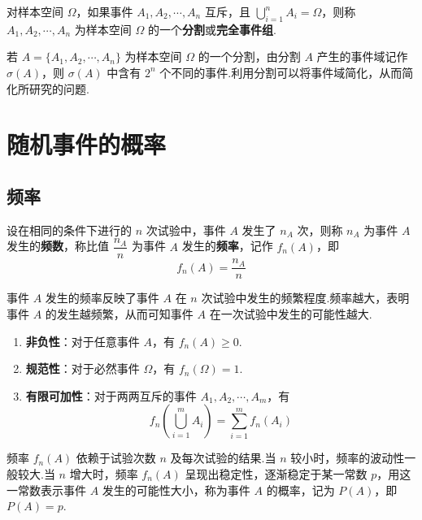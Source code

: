 \begin{definition}
    \indent 对样本空间 $\varOmega$，如果事件 $A_1,A_2,\cdots,A_n$ 互斥，且 $\displaystyle\bigcup_{i=1}^n A_i=\varOmega$，则称 $A_1,A_2,\cdots,A_n$ 为样本空间 $\varOmega$ 的一个\textbf{分割}或\textbf{完全事件组}.
\end{definition}

若 $A = \{ A_1,A_2,\cdots,A_n \}$ 为样本空间 $\varOmega$ 的一个分割，由分割 $A$ 产生的事件域记作 $\sigma(A)$，则 $\sigma(A)$ 中含有 $2^n$ 个不同的事件.利用分割可以将事件域简化，从而简化所研究的问题.

\section{随机事件的概率}

\subsection{频率}

\begin{definition}
    \indent 设在相同的条件下进行的 $n$ 次试验中，事件 $A$ 发生了 $n_A$ 次，则称 $n_A$ 为事件 $A$ 发生的\textbf{频数}，称比值 $\dfrac{n_A}{n}$ 为事件 $A$ 发生的\textbf{频率}，记作 $f_n(A)$，即
    $$
    f_n(A)=\dfrac{n_A}{n}
    $$
\end{definition}

事件 $A$ 发生的频率反映了事件 $A$ 在 $n$ 次试验中发生的频繁程度.频率越大，表明事件 $A$ 的发生越频繁，从而可知事件 $A$ 在一次试验中发生的可能性越大.

\begin{property}[][频率的基本性质]
    \begin{enumerate}
        \item \textbf{非负性}：对于任意事件 $A$，有 $f_n(A) \geqslant 0$.
        \item \textbf{规范性}：对于必然事件 $\varOmega$，有 $f_n(\varOmega)=1$.
        \item \textbf{有限可加性}：对于两两互斥的事件 $A_1,A_2,\cdots,A_m$，有
        $$
        f_n \left(\bigcup_{i=1}^m A_i \right) = \sum_{i=1}^m f_n(A_i)
        $$
    \end{enumerate}
\end{property}

频率 $f_n(A)$ 依赖于试验次数 $n$ 及每次试验的结果.当 $n$ 较小时，频率的波动性一般较大.当 $n$ 增大时，频率 $f_n(A)$ 呈现出稳定性，逐渐稳定于某一常数 $p$，用这一常数表示事件 $A$ 发生的可能性大小，称为事件 $A$ 的概率，记为 $P(A)$，即 $P(A)=p$.

